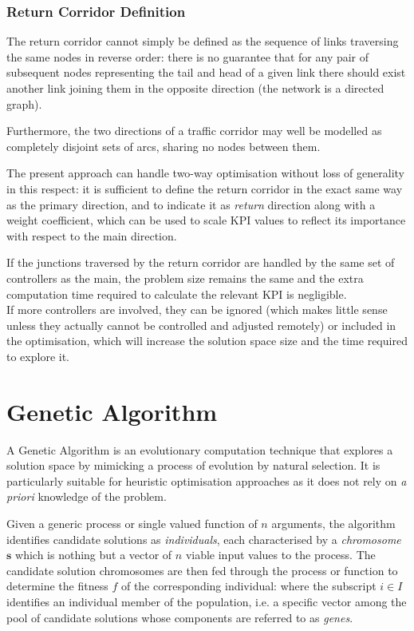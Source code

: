 \subsubsection*{Return Corridor Definition}
The return corridor cannot simply be defined as the sequence of links traversing the same nodes in reverse order: there is no guarantee that for any pair of subsequent nodes representing the tail and head of a given link there should exist another link joining them in the opposite direction (the network is a directed graph).

Furthermore, the two directions of a traffic corridor may well be modelled as completely disjoint sets of arcs, sharing no nodes between them.

The present approach can handle two-way optimisation without loss of generality in this respect: it is sufficient to define the return corridor in the exact same way as the primary direction, and to indicate it as \emph{return} direction along with a weight coefficient, which can be used to scale KPI values to reflect its importance with respect to the main direction.

If the junctions traversed by the return corridor are handled by the same set of controllers as the main, the problem size remains the same and the extra computation time required to calculate the relevant KPI is negligible. \\
If more controllers are involved, they can be ignored (which makes little sense unless they actually cannot be controlled and adjusted remotely) or included in the optimisation, which will increase the solution space size and the time required to explore it.


\section{Genetic Algorithm} \label{s:geneticalgo}
\newcommand{\solution}{\mathbf{s}}
A Genetic Algorithm is an evolutionary computation technique that explores a solution space by mimicking a process of evolution by natural selection. It is particularly suitable for heuristic optimisation approaches as it does not rely on \emph{a priori} knowledge of the problem.


Given a generic process or single valued function of $n$ arguments, the algorithm identifies candidate solutions as \emph{individuals}, each characterised by a \emph{chromosome} $\solution$ which is nothing but a vector of $n$ viable input values to the process. The candidate solution chromosomes are then fed through the process or function to determine the fitness $f$ of the corresponding individual:
\eq{e:gafitness}{
\omega_i = \phi(\solution_i)\qquad \mathrm{with} \quad 
\solution_i = \left\lbrace s_i^1, s_i^2, \dots s_i^n\right\rbrace
}
where the subscript $i \in I$ identifies an individual member of the population, i.e. a specific vector among the pool of candidate solutions whose components are referred to as \emph{genes}.

